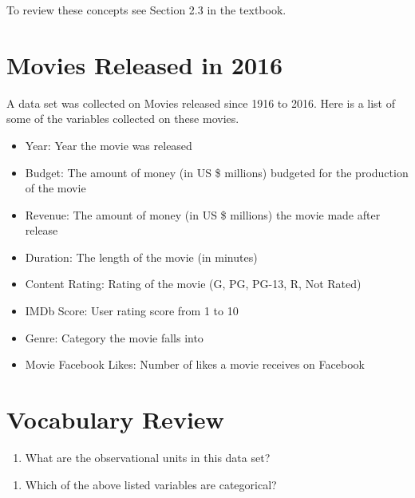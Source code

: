 \documentclass[
]{report}
\providecommand{\tightlist}{%
  \setlength{\itemsep}{0pt}\setlength{\parskip}{0pt}}
\begin{document}
To review these concepts see Section 2.3 in the textbook.

\hypertarget{movies-released-in-2016}{%
\section{Movies Released in 2016}\label{movies-released-in-2016}}

A data set was collected on Movies released since 1916 to 2016. Here is a list of some of the variables collected on these movies.

\begin{itemize}
\item
  Year: Year the movie was released
\item
  Budget: The amount of money (in US \$ millions) budgeted for the production of the movie
\item
  Revenue: The amount of money (in US \$ millions) the movie made after release
\item
  Duration: The length of the movie (in minutes)
\item
  Content Rating: Rating of the movie (G, PG, PG-13, R, Not Rated)
\item
  IMDb Score: User rating score from 1 to 10
\item
  Genre: Category the movie falls into
\item
  Movie Facebook Likes: Number of likes a movie receives on Facebook
\end{itemize}

\hypertarget{vocabulary-review}{%
\section{Vocabulary Review}\label{vocabulary-review}}

\begin{enumerate}
\def\labelenumi{\arabic{enumi}.}
\tightlist
\item
  What are the observational units in this data set?
\end{enumerate}

\vspace{0.5in}

\begin{enumerate}
\def\labelenumi{\arabic{enumi}.}
\setcounter{enumi}{1}
\tightlist
\item
  Which of the above listed variables are categorical?
\end{enumerate}

\vspace{1in}
\end{document}
